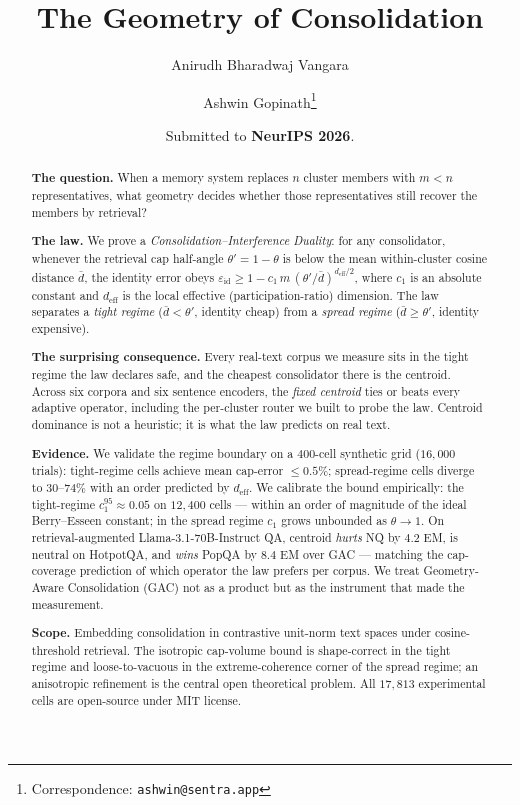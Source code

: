 \documentclass[11pt]{article}
\title{The Geometry of Consolidation}
\author[1,2]{Anirudh Bharadwaj Vangara}
\author[1,3]{Ashwin Gopinath\thanks{Correspondence: \texttt{ashwin@sentra.app}}}
\affil[1]{Sentra, 235 2nd Street, San Francisco, CA 94105, USA}
\affil[2]{Department of Computer Engineering, University of Waterloo, Waterloo, ON N2L 3G1, Canada}
\affil[3]{Department of Mechanical Engineering, Massachusetts Institute of Technology, Cambridge, MA 02139, USA}
\date{Submitted to \textbf{NeurIPS 2026}.}
\theoremstyle{definition}
\theoremstyle{remark}
\newcommand{\deff}{d_{\mathrm{eff}}}
\newcommand{\dbar}{\bar{d}}
\newcommand{\thetap}{\theta'}
\newcommand{\eps}{\varepsilon}
\begin{document}
\maketitle

\begin{abstract}
\noindent\textbf{The question.} When a memory system replaces $n$ cluster
members with $m < n$ representatives, what geometry decides whether those
representatives still recover the members by retrieval?

\noindent\textbf{The law.} We prove a \emph{Consolidation--Interference
Duality}: for any consolidator, whenever the retrieval cap half-angle
$\thetap = 1-\theta$ is below the mean within-cluster cosine distance
$\dbar$, the identity error obeys
$\eps_{\mathrm{id}} \geq 1 - c_1\,m\,(\thetap/\dbar)^{\deff/2}$,
where $c_1$ is an absolute constant and $\deff$ is the local effective
(participation-ratio) dimension. The law separates a \emph{tight regime}
($\dbar < \thetap$, identity cheap) from a \emph{spread regime}
($\dbar \geq \thetap$, identity expensive).

\noindent\textbf{The surprising consequence.} Every real-text corpus we
measure sits in the tight regime the law declares safe, and the cheapest
consolidator there is the centroid. Across six corpora and six sentence
encoders, the \emph{fixed centroid} ties or beats every adaptive operator,
including the per-cluster router we built to probe the law. Centroid
dominance is not a heuristic; it is what the law predicts on real text.

\noindent\textbf{Evidence.} We validate the regime boundary on a
$400$-cell synthetic grid ($16{,}000$ trials): tight-regime cells achieve
mean cap-error $\leq 0.5\%$; spread-regime cells diverge to $30$--$74\%$
with an order predicted by $\deff$. We calibrate the bound empirically:
the tight-regime $c_1^{95} \approx 0.05$ on $12{,}400$ cells --- within
an order of magnitude of the ideal Berry--Esseen constant; in the spread
regime $c_1$ grows unbounded as $\theta \to 1$. On
retrieval-augmented Llama-3.1-70B-Instruct QA, centroid \emph{hurts} NQ by
$4.2$ EM, is neutral on HotpotQA, and \emph{wins} PopQA by $8.4$ EM over
GAC --- matching the cap-coverage prediction of which operator the law
prefers per corpus. We treat Geometry-Aware Consolidation (GAC) not as a
product but as the instrument that made the measurement.

\noindent\textbf{Scope.} Embedding consolidation in contrastive unit-norm
text spaces under cosine-threshold retrieval. The isotropic cap-volume
bound is shape-correct in the tight regime and loose-to-vacuous in the
extreme-coherence corner of the spread regime; an anisotropic refinement
is the central open theoretical problem. All $17{,}813$ experimental
cells are open-source under MIT license.
\end{abstract}
\end{document}
